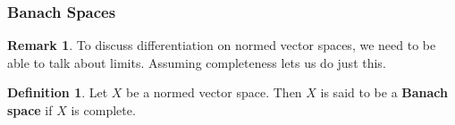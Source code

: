 \documentclass[notheorems]{beamer}
\theoremstyle{definition}
\newtheorem{defn}[definition]{Definition}
\newtheorem{rem}[definition]{Remark}
\begin{document}
	
	
	
	
	
	
	
	






\begin{frame}
\frametitle{Banach Spaces}



	\begin{rem}
	To discuss differentiation on normed vector spaces, we need to be able to talk about limits. Assuming completeness lets us do just this. 
	\end{rem}
	
	\pause
\begin{defn}
		Let $X$ be a normed vector space. Then $X$ is said to be a \textbf{Banach space} if $X$ is complete.  
	\end{defn}
	
	
\end{frame}
\end{document}
